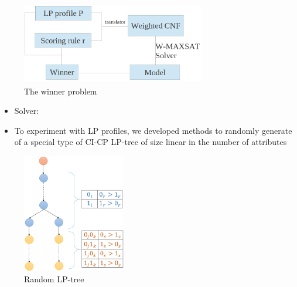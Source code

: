 {
	\begin{figure}
		\centering
		\includegraphics[width=8cm,height=3.6cm]{figs/LPTrees/sat_win_struct.png}
		\caption{The winner problem}
	\end{figure}

	\vspace{-0.45cm}

	\begin{itemize}
		\item Solver: 
	\end{itemize}
}

{
	\begin{itemize}
		\item To experiment with LP profiles, we developed methods to randomly generate
					 of
          a special type of CI-CP LP-tree of size linear in the number of
          attributes
	\end{itemize}

	\begin{figure}
		\vspace{-0.2cm}
		\centering
		\includegraphics[width=0.4\textwidth]{figs/LPTrees/simple_LP_tree.png}
		\vspace{-0.3cm}
		\caption{Random LP-tree}
	\end{figure}
}

